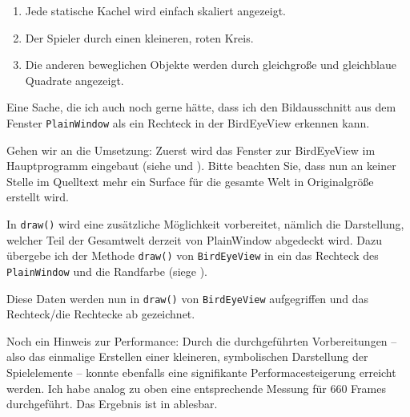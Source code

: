 \begin{enumerate}
	\item Jede statische Kachel wird einfach skaliert angezeigt.
	\item Der Spieler durch einen kleineren, roten Kreis.
	\item Die anderen beweglichen Objekte werden durch gleichgroße und gleichblaue Quadrate angezeigt.
\end{enumerate}

Eine Sache, die ich auch noch gerne hätte, dass ich den Bildausschnitt aus dem Fenster \texttt{PlainWindow} als ein Rechteck in der BirdEyeView erkennen kann.

Gehen wir an die Umsetzung: Zuerst wird das Fenster zur BirdEyeView im Hauptprogramm eingebaut (siehe  und ). Bitte beachten Sie, dass nun an keiner Stelle im Quelltext mehr ein Surface für die gesamte Welt in Originalgröße erstellt wird.


In \texttt{draw()} wird eine zusätzliche Möglichkeit vorbereitet, nämlich die Darstellung, welcher Teil der Gesamtwelt derzeit von PlainWindow abgedeckt wird. Dazu übergebe ich der Methode \texttt{draw()} von \texttt{BirdEyeView} in  ein das Rechteck des \texttt{PlainWindow} und die Randfarbe (siege ).


Diese Daten werden nun in \texttt{draw()} von \texttt{BirdEyeView} aufgegriffen und das Rechteck/die Rechtecke ab  gezeichnet.



Noch ein Hinweis zur Performance: Durch die durchgeführten Vorbereitungen -- also das einmalige Erstellen einer kleineren, symbolischen Darstellung der Spielelemente -- konnte ebenfalls eine signifikante Performacesteigerung erreicht werden. Ich habe analog zu oben eine entsprechende Messung für 660 Frames durchgeführt. Das Ergebnis ist in  ablesbar. 


